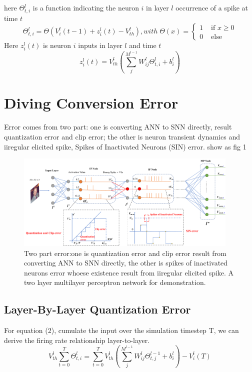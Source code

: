 \documentclass{article}
\begin{document}
here $\Theta_{t,i}^{l}$ is a function indicating the neuron $i$ in layer $l$ occurrence of a spike at time $t$
\begin{equation}
  \Theta_{t, i}^{l}=\Theta\left(V_{i}^{l}(t-1)+z_{i}^{l}(t)-V_{th}^l\right), with \; \Theta(x)= \begin{cases}1 & \text { if } x \geq 0 \\ 0 & \text { else }\end{cases}
\end{equation}
Here $z_i^l(t)$ is neuron $i$ inputs in layer $l$ and time $t$
\begin{equation}
  z_{i}^{l}(t) = V_{th}^l\left(\sum_j^{M^{l-1}}W_{ij}^l\Theta_{t,i}^{l}+b_i^l\right)
\end{equation}

\section{Diving Conversion Error}
Error comes from two part: one is converting ANN to SNN directly, result quantization error and clip error; the other is neuron transient dynamics and iiregular elicited spike, Spikes of Inactivated Neurons
(SIN) error.
show as fig 1
\begin{figure}[htbp]
  \centering
  \includegraphics[width=0.95\textwidth]{error.pdf}
  \caption{Two part error:one is quantization error and clip error result from converting ANN to SNN directly, the other is spikes of inactivated neurons error whoese existence result from iiregular elicited spike. A two layer multilayer perceptron network for demonstration.}
\end{figure}
\subsection{Layer-By-Layer Quantization Error}

For equation (2), cumulate the input over the simulation timestep T, we can derive the firing rate relationship layer-to-layer.
\begin{equation}
  V_{th}^l\sum_{t=0}^T\Theta_{t,i}^{l}=\sum_{t=0}^TV_{th}^l\left(\sum_j^{M^{l-1}}W_{ij}^l\Theta_{t,j}^{l-1}+b_i^l\right) - V_i^l(T)
\end{equation}
\end{document}
